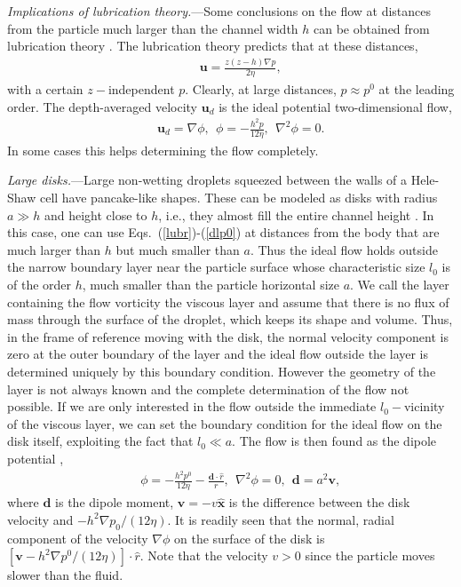 {\it Implications of lubrication theory.}---Some conclusions on the flow at distances from the particle much larger than the channel width $h$ can be obtained from lubrication theory \cite{Batchelor,lubr,szeri,bruce}. The lubrication theory predicts that at these distances,
\begin{eqnarray}&&
\bm u=\frac{z(z-h)\nabla p}{2\eta},\label{lubr}
\end{eqnarray}
with a certain $z-$independent $p$. Clearly, at large distances, $p\approx p^0$ at the leading order. The depth-averaged velocity $\bm u_d$ is the ideal potential two-dimensional flow,
\begin{eqnarray}&&
\bm u_d=\nabla\phi,\ \ \phi=-\frac{h^2 p}{12\eta},\ \ \nabla^2\phi=0.\label{dlp0}
\end{eqnarray}
In some cases this helps determining the flow completely.

{\it Large disks.}---Large non-wetting droplets squeezed between the walls of a Hele-Shaw cell have pancake-like shapes. These can be modeled as disks with radius $a\gg h$ and height close to $h$, i.e., they almost fill the entire channel height \cite{tlusty,tl2006,tl2012,tl2014}. In this case, one can use Eqs.~(\ref{lubr})-(\ref{dlp0}) at distances from the body that are much larger than $h$ but much smaller than $a$. Thus the ideal flow holds outside the narrow boundary layer near the particle surface whose characteristic size $l_0$ is of the order $h$, much smaller than the particle horizontal size $a$. We call the layer containing the flow vorticity the viscous layer and assume that there is no flux of mass through the surface of the droplet, which keeps its shape and volume. Thus, in the frame of reference moving with the disk, the normal 
velocity component is zero at the outer boundary of the layer and the ideal flow outside the layer is determined uniquely by this boundary condition. However the geometry of the layer is not always known and the complete determination of the flow not possible. If we are only interested in the flow outside the immediate $l_0-$vicinity of the viscous layer,  we can set the boundary condition for the ideal flow on the disk itself, exploiting the fact that $l_0\ll a$. The flow is then found as the dipole potential \cite{tlusty},
\begin{eqnarray}&&
\phi=-\frac{h^2 p^0}{12\eta}-\frac{\bm d\cdot{\hat r}}{r} ,\ \ \nabla^2\phi=0,\ \ \bm d=a^2\bm v,\label{dl}
\end{eqnarray}
where $\bm d$ is the dipole moment, $\bm v=-v\bm{\hat x}$ is the difference between the disk velocity and $-h^2\nabla p_0/(12\eta)$. It is readily seen that the normal, radial component of the velocity $\nabla \phi$ on the surface of the disk is $[\bm v-h^2\nabla p^0/(12\eta)]\cdot{\hat r}$. Note that the velocity $v>0$ since the particle moves slower than the fluid.

